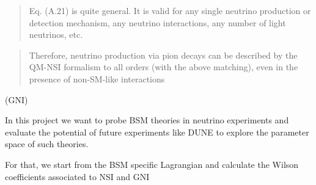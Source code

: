 \documentclass[a4paper,10pt,epsfig,epsf,amsfonts,amsmath]{article}
\begin{document}
\begin{ideas}
\begin{quote}
    Eq. (A.21) is quite general. It is valid for any single neutrino production or detection
mechanism, any neutrino interactions, any number of light neutrinos, etc.
\end{quote}

\begin{quote}
    Therefore, neutrino production via pion decays can be described
by the QM-NSI formalism to all orders (with the above matching), even in the presence of
non-SM-like interactions
\end{quote}

\end{ideas}


(GNI)

In this project we want to probe BSM theories in neutrino experiments and evaluate the potential of future experiments like DUNE to explore the parameter space of such theories.

For that, we start from the BSM specific Lagrangian and calculate the Wilson coefficients associated to NSI and GNI
\end{document}
